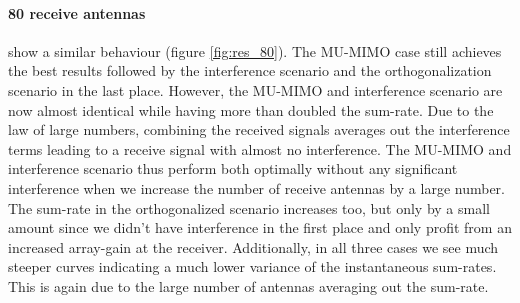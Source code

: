 \documentclass[10pt,a4paper]{article}
\begin{document}
	\paragraph{80 receive antennas} show a similar behaviour (figure \ref{fig:res_80}). The MU-MIMO case still achieves the best results followed by the interference scenario and the orthogonalization scenario in the last place. However, the MU-MIMO and interference scenario are now almost identical while having more than doubled the sum-rate. Due to the law of large numbers, combining the received signals averages out the interference terms leading to a receive signal with almost no interference. The MU-MIMO and interference scenario thus perform both optimally without any significant interference when we increase the number of receive antennas by a large number. The sum-rate in the orthogonalized scenario increases too, but only by a small amount since we didn't have interference in the first place and only profit from an increased array-gain at the receiver. Additionally, in all three cases we see much steeper curves indicating a much lower variance of the instantaneous sum-rates. This is again due to the large number of antennas averaging out the sum-rate.
	
\end{document}
